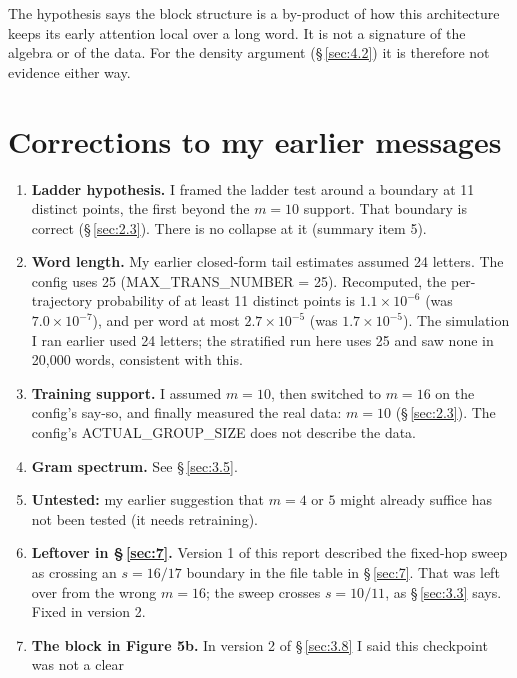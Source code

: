 \documentclass[paper=a4,fontsize=11pt,DIV=11,parskip=half,headings=small,numbers=noendperiod]{scrartcl}
\DeclareRobustCommand{\lead}[1]{\textsf{\bfseries\color{accent}#1}}
\DeclareRobustCommand{\code}[1]{{\fontseries{m}\ttfamily #1}}
\begin{document}
The hypothesis says the block structure is a by-product of how this architecture keeps its early attention local
over a long word. It is not a signature of the algebra or of the data. For the density argument
(\S\,\ref{sec:4.2}) it is therefore not evidence either way.

\section{Corrections to my earlier messages}\label{sec:5}
\begin{enumerate}
\item \lead{Ladder hypothesis.} I framed the ladder test around a boundary at 11 distinct points, the first
  beyond the $m=10$ support. That boundary is correct (\S\,\ref{sec:2.3}). There is no collapse at it (summary
  item 5).
\item \lead{Word length.} My earlier closed-form tail estimates assumed 24 letters. The config uses 25
  (\code{MAX\_\allowbreak{}TRANS\_\allowbreak{}NUMBER = 25}). Recomputed, the per-trajectory probability of at
  least 11 distinct points is $1.1\times10^{-6}$ (was $7.0\times10^{-7}$), and per word at most
  $2.7\times10^{-5}$ (was $1.7\times10^{-5}$). The simulation I ran earlier used 24 letters; the stratified run
  here uses 25 and saw none in 20,000 words, consistent with this.
\item \lead{Training support.} I assumed $m=10$, then switched to $m=16$ on the config’s say-so, and finally
  measured the real data: $m=10$ (\S\,\ref{sec:2.3}). The config’s
  \code{ACTUAL\_\allowbreak{}GROUP\_\allowbreak{}SIZE} does not describe the data.
\item \lead{Gram spectrum.} See \S\,\ref{sec:3.5}.
\item \lead{Untested:} my earlier suggestion that $m=4$ or $5$ might already suffice has not been tested (it
  needs retraining).
\item \lead{Leftover in \S\,\ref{sec:7}.} Version 1 of this report described the fixed-hop sweep as crossing an
  $s=16/17$ boundary in the file table in \S\,\ref{sec:7}. That was left over from the wrong $m=16$; the sweep
  crosses $s=10/11$, as \S\,\ref{sec:3.3} says. Fixed in version 2.
\item \lead{The block in Figure 5b.} In version 2 of \S\,\ref{sec:3.8} I said this checkpoint was not a clear

\end{enumerate}
\end{document}
